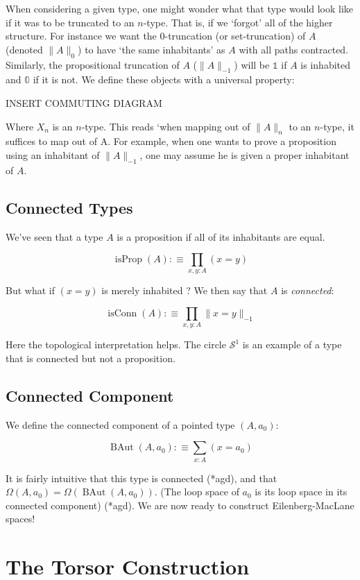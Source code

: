 \documentclass{article}
\DeclareMathOperator{\isprop}{isProp}
\DeclareMathOperator{\isconn}{isConn}
\DeclareMathOperator{\baut}{BAut}
\begin{document}
When considering a given type, one might wonder what that type would look like if it was to be truncated to an $n$-type. That is, if we `forgot' all of the higher structure. For instance we want the $0$-truncation (or set-truncation) of $A$ (denoted $\|A\|_{0}$) to have `the same inhabitants' as $A$ with all paths contracted. Similarly, the propositional truncation of $A$ ($\|A\|_{-1}$) will be $\mathbb{1}$ if $A$ is inhabited and $\mathbb{0}$ if it is not. We define these objects with a universal property:

INSERT COMMUTING DIAGRAM

Where $X_{n}$ is an $n$-type. This reads `when mapping out of $\|A\|_{n}$ to an $n$-type, it suffices to map out of A. For example, when one wants to prove a proposition using an inhabitant of $\|A\|_{-1}$, one may assume he is given a proper inhabitant of $A$.

\subsection{Connected Types}

We've seen that a type $A$ is a proposition if all of its inhabitants are equal.

\[\isprop(A) :\equiv \prod_{x,y : A} (x = y)\]

But what if $(x = y)$ is merely inhabited ? We then say that $A$ is \emph{connected}:

\[\isconn(A) :\equiv \prod_{x,y : A} \|x = y \|_{-1}\]

Here the topological interpretation helps. The circle $\mathcal{S}^{1}$ is an example of a type that is connected but not a proposition.

\subsection{Connected Component}

We define the connected component of a pointed type $(A,a_0)$:

\[\baut(A,a_0) :\equiv \sum_{x : A} (x = a_0)\]

It is fairly intuitive that this type is connected (*agd), and that $\Omega(A,a_0) = \Omega(\baut(A,a_0))$. (The loop space of $a_0$ is its loop space in its connected component) (*agd). We are now ready to construct Eilenberg-MacLane spaces!

\section{The Torsor Construction}
\end{document}
